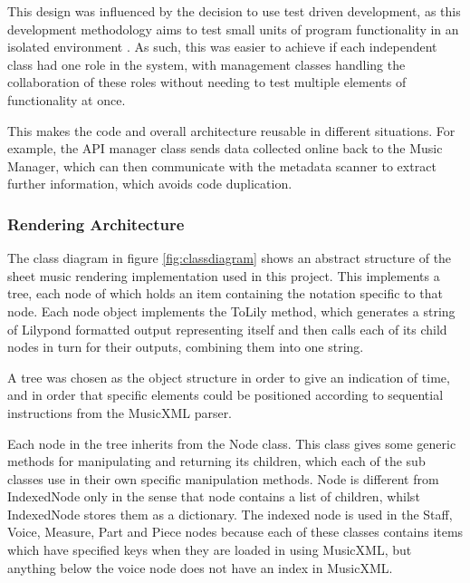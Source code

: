 This design was influenced by the decision to use test driven development, as this development methodology aims to test small units of program functionality in an isolated environment \parencite{TDD}.
 As such, this was easier to achieve if each independent class had one role in the system, with management classes handling the collaboration of these roles without needing to test multiple elements of functionality at once. 

This makes the code and overall architecture reusable in different situations. For example, the API manager class sends data collected online back to the Music Manager, which can then communicate with the metadata scanner to extract further information, which avoids code duplication.

\subsubsection{Rendering Architecture}
The class diagram in figure \ref{fig:classdiagram} shows an abstract structure of the sheet music rendering implementation used in this project. This implements a tree, each node of which holds an item containing the notation specific to that node. Each node object implements the ToLily method, which generates a string of Lilypond formatted output representing itself and then calls each of its child nodes in turn for their outputs, combining them into one string. 

A tree was chosen as the object structure in order to give an indication of time, and in order that specific elements could be positioned according to sequential instructions from the MusicXML parser. 

Each node in the tree inherits from the Node class. This class gives some generic methods for manipulating and returning its children, which each of the sub classes use in their own specific manipulation methods. Node is different from IndexedNode only in the sense that node contains a list of children, whilst IndexedNode stores them as a dictionary. The indexed node is used in the Staff, Voice, Measure, Part and Piece nodes because each of these classes contains items which have specified keys when they are loaded in using MusicXML, but anything below the voice node does not have an index in MusicXML.

